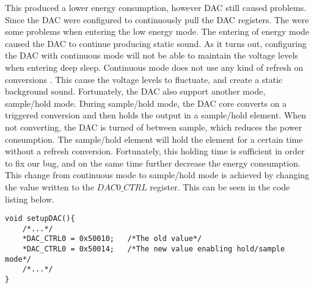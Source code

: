 This produced a lower energy consumption, however DAC still caused problems. Since the DAC were configured to continuously pull the DAC registers. The were some problems when entering the low energy mode. The entering of energy mode caused the DAC to continue producing static sound. As it turns out, configuring the DAC with continuous mode will not be able to maintain the voltage levels when entering deep sleep. Continuous mode does not use any kind of refresh on conversions \cite{EFM32GG-rm}. This cause the voltage levels to fluctuate, and create a static background sound. Fortunately, the DAC also support another mode, sample/hold mode. During sample/hold mode, the DAC core converts on a triggered conversion and then holds the output in a sample/hold element. When not converting, the DAC is turned of between sample, which reduces the power consumption. The sample/hold element will hold the element for a certain time without a refresh conversion\cite{EFM32GG-rm}. Fortunately, this holding time is sufficient in order to fix our bug, and on the same time further decrease the energy consumption. This change from continuous mode to sample/hold mode is achieved by changing the value written to the $DAC0\_CTRL$ register. This can be seen in the code listing below. 


\begin{lstlisting}
void setupDAC(){
    /*...*/
    *DAC_CTRL0 = 0x50010;   /*The old value*/
    *DAC_CTRL0 = 0x50014;   /*The new value enabling hold/sample mode*/
    /*...*/
}
\end{lstlisting}


   



  
       

 



